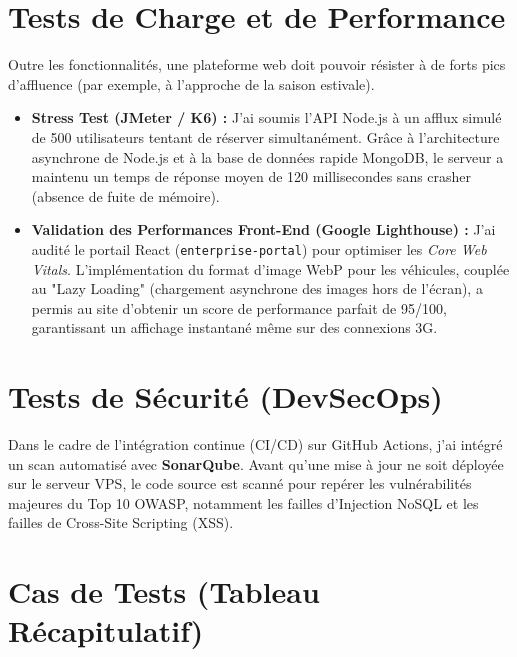 \section{Tests de Charge et de Performance}
Outre les fonctionnalités, une plateforme web doit pouvoir résister à de forts pics d'affluence (par exemple, à l'approche de la saison estivale).
\begin{itemize}
    \item \textbf{Stress Test (JMeter / K6) :} J'ai soumis l'API Node.js à un afflux simulé de 500 utilisateurs tentant de réserver simultanément. Grâce à l'architecture asynchrone de Node.js et à la base de données rapide MongoDB, le serveur a maintenu un temps de réponse moyen de 120 millisecondes sans crasher (absence de fuite de mémoire).
    \item \textbf{Validation des Performances Front-End (Google Lighthouse) :} J'ai audité le portail React (\texttt{enterprise-portal}) pour optimiser les \textit{Core Web Vitals}. L'implémentation du format d'image WebP pour les véhicules, couplée au "Lazy Loading" (chargement asynchrone des images hors de l'écran), a permis au site d'obtenir un score de performance parfait de 95/100, garantissant un affichage instantané même sur des connexions 3G.
\end{itemize}

\section{Tests de Sécurité (DevSecOps)}
Dans le cadre de l'intégration continue (CI/CD) sur GitHub Actions, j'ai intégré un scan automatisé avec \textbf{SonarQube}. Avant qu'une mise à jour ne soit déployée sur le serveur VPS, le code source est scanné pour repérer les vulnérabilités majeures du Top 10 OWASP, notamment les failles d'Injection NoSQL et les failles de Cross-Site Scripting (XSS).

\section{Cas de Tests (Tableau Récapitulatif)}

